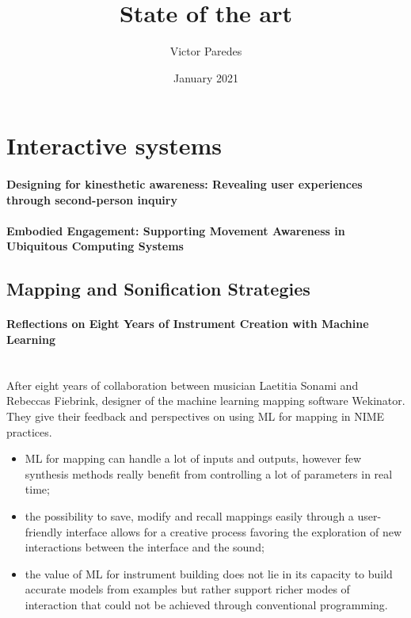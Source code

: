 \documentclass[11pt]{article}
\title{State of the art}
\author{Victor Paredes}
\date{January 2021}
\begin{document}
\maketitle
\tableofcontents



\section{Interactive systems}
\paragraph{Designing for kinesthetic awareness: Revealing user experiences through second-person inquiry} \citep{francoise_designing_2017}

\paragraph{Embodied Engagement: Supporting Movement Awareness in Ubiquitous Computing Systems} \citep{levisohn_embodied_2011}


\subsection{Mapping and Sonification Strategies}
\paragraph{Reflections on Eight Years of Instrument Creation with Machine Learning} \citep{fiebrink_reflections_2020} \\
After eight years of collaboration between musician Laetitia Sonami and Rebeccas Fiebrink, designer of the machine learning mapping software Wekinator. They give their feedback and perspectives on using ML for mapping in NIME practices.
\begin{itemize}
    \item ML for mapping can handle a lot of inputs and outputs, however few synthesis methods really benefit from controlling a lot of parameters in real time;
    \item the possibility to save, modify and recall mappings easily through a user-friendly interface allows for a creative process favoring the exploration of new interactions between the interface and the sound;
    \item the value of ML for instrument building does not lie in its capacity to build accurate models from examples but rather support richer modes of interaction that could not be achieved through conventional programming.
\end{itemize}
\end{document}
